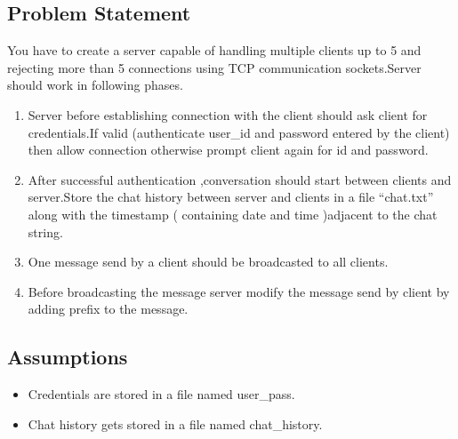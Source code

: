 \documentclass[12pt]{article}
\begin{document}
		\subsection{Problem Statement}
		You have to create a server capable of handling multiple clients up to 5 and ​rejecting more
		than 5 connections ​using TCP communication sockets.Server should work in following phases.
		\begin{enumerate}
		\item Server before establishing connection with the client should ask client for credentials.If
		valid (authenticate user\_id and password entered by the client) then allow connection
		otherwise prompt client again for id and password.
		\item After successful authentication ,conversation should start between clients and
		server.Store the chat history between server and clients in a file “chat.txt” along with the
		timestamp ( containing date and time )adjacent to the chat string.
		\item One message send by a client should be broadcasted to all clients.
		\item Before broadcasting the message server modify the message send by client by adding
		prefix to the message.
				\end{enumerate}
			
		
		\subsection{Assumptions}
		
			\begin{itemize}
				\item Credentials are stored in a file named user\_pass.
				\item Chat history gets stored in a file named chat\_history.
			\end{itemize}
		
\end{document}
